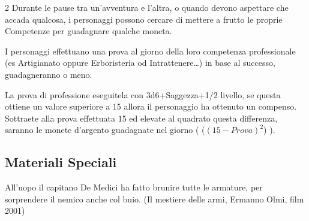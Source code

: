 \begin{multicols}{2}
Durante le pause tra un'avventura e l'altra, o quando devono aspettare che accada qualcosa, i personaggi possono cercare di mettere a frutto le proprie Competenze per guadagnare qualche moneta.

I personaggi effettuano una prova al giorno della loro competenza professionale (es Artigianato oppure Erboristeria od Intrattenere…) in base al successo, guadagneranno o meno.

La prova di professione eseguitela con 3d6+Saggezza+1/2 livello, se questa ottiene un valore superiore a 15 allora il personaggio ha ottenuto un compenso. Sottraete alla prova effettuata 15 ed elevate al quadrato questa differenza, saranno le monete d'argento guadagnate nel giorno ( ($(15-Prova)^2$) ).

\end{multicols}

\pagebreak

\subsection{Materiali Speciali}

\begin{enfasi}{
All'uopo il capitano De Medici ha fatto brunire tutte le armature, per sorprendere il nemico anche col buio. (Il mestiere delle armi, Ermanno Olmi, film 2001)}\end{enfasi}


